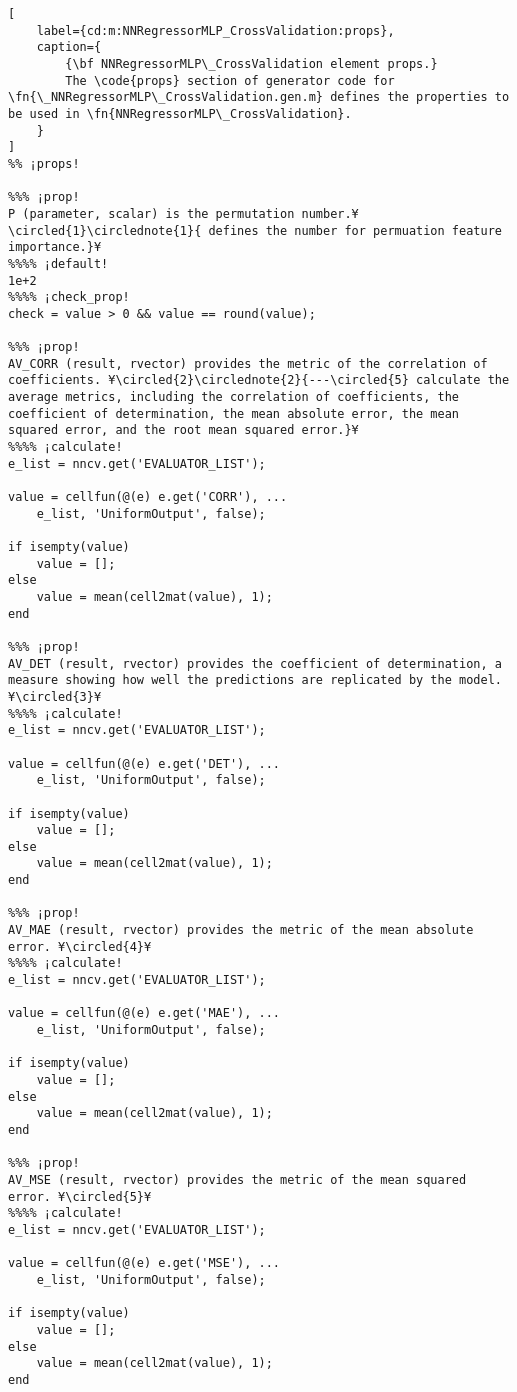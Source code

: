 \documentclass{tufte-handout}
\begin{document}
\begin{lstlisting}[
	label={cd:m:NNRegressorMLP_CrossValidation:props},
	caption={
		{\bf NNRegressorMLP\_CrossValidation element props.}
		The \code{props} section of generator code for \fn{\_NNRegressorMLP\_CrossValidation.gen.m} defines the properties to be used in \fn{NNRegressorMLP\_CrossValidation}.
	}
]
%% ¡props!

%%% ¡prop!
P (parameter, scalar) is the permutation number.¥\circled{1}\circlednote{1}{ defines the number for permuation feature importance.}¥
%%%% ¡default!
1e+2
%%%% ¡check_prop!
check = value > 0 && value == round(value);

%%% ¡prop!
AV_CORR (result, rvector) provides the metric of the correlation of coefficients. ¥\circled{2}\circlednote{2}{---\circled{5} calculate the average metrics, including the correlation of coefficients, the coefficient of determination, the mean absolute error, the mean squared error, and the root mean squared error.}¥
%%%% ¡calculate!
e_list = nncv.get('EVALUATOR_LIST');

value = cellfun(@(e) e.get('CORR'), ...
    e_list, 'UniformOutput', false);

if isempty(value)
    value = [];
else
    value = mean(cell2mat(value), 1);
end

%%% ¡prop!
AV_DET (result, rvector) provides the coefficient of determination, a measure showing how well the predictions are replicated by the model. ¥\circled{3}¥
%%%% ¡calculate!
e_list = nncv.get('EVALUATOR_LIST');

value = cellfun(@(e) e.get('DET'), ...
    e_list, 'UniformOutput', false);

if isempty(value)
    value = [];
else
    value = mean(cell2mat(value), 1);
end

%%% ¡prop!
AV_MAE (result, rvector) provides the metric of the mean absolute error. ¥\circled{4}¥
%%%% ¡calculate!
e_list = nncv.get('EVALUATOR_LIST');

value = cellfun(@(e) e.get('MAE'), ...
    e_list, 'UniformOutput', false);

if isempty(value)
    value = [];
else
    value = mean(cell2mat(value), 1);
end

%%% ¡prop!
AV_MSE (result, rvector) provides the metric of the mean squared error. ¥\circled{5}¥
%%%% ¡calculate!
e_list = nncv.get('EVALUATOR_LIST');

value = cellfun(@(e) e.get('MSE'), ...
    e_list, 'UniformOutput', false);

if isempty(value)
    value = [];
else
    value = mean(cell2mat(value), 1);
end


\end{lstlisting}
\end{document}
